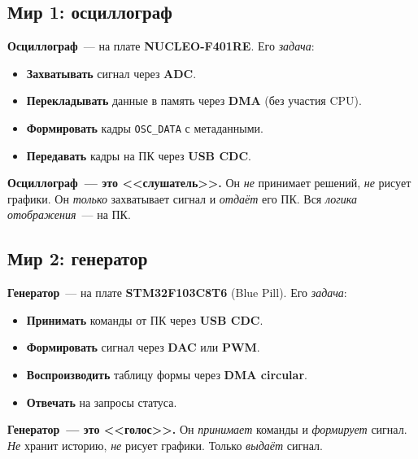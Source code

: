 \subsection{Мир 1: осциллограф}

\textbf{Осциллограф}~--- на плате \textbf{NUCLEO-F401RE}.
Его \emph{задача}:

\begin{itemize}
    \item \textbf{Захватывать} сигнал через \textbf{ADC}.
    \item \textbf{Перекладывать} данные в память через
          \textbf{DMA} (без участия CPU).
    \item \textbf{Формировать} кадры \texttt{OSC\_DATA}
          с метаданными.
    \item \textbf{Передавать} кадры на ПК через
          \textbf{USB CDC}.
\end{itemize}

\begin{keybox}
\textbf{Осциллограф~--- это <<слушатель>>.} Он \emph{не}
принимает решений, \emph{не} рисует графики. Он \emph{только}
захватывает сигнал и \emph{отдаёт} его ПК. Вся \emph{логика
отображения}~--- на ПК.
\end{keybox}

\subsection{Мир 2: генератор}

\textbf{Генератор}~--- на плате \textbf{STM32F103C8T6}
(Blue Pill). Его \emph{задача}:

\begin{itemize}
    \item \textbf{Принимать} команды от ПК через
          \textbf{USB CDC}.
    \item \textbf{Формировать} сигнал через \textbf{DAC}
          или \textbf{PWM}.
    \item \textbf{Воспроизводить} таблицу формы через
          \textbf{DMA circular}.
    \item \textbf{Отвечать} на запросы статуса.
\end{itemize}

\begin{keybox}
\textbf{Генератор~--- это <<голос>>.} Он \emph{принимает}
команды и \emph{формирует} сигнал. \emph{Не} хранит
историю, \emph{не} рисует графики. Только \emph{выдаёт}
сигнал.
\end{keybox}

